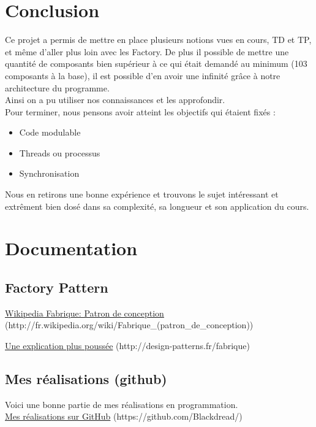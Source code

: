 \documentclass{report}
\begin{document}
\chapter{Conclusion}
Ce projet a permis de mettre en place plusieurs notions vues en cours, TD et TP, et même d'aller plus loin avec les Factory. De plus il possible de mettre une quantité de composants bien supérieur à ce qui était demandé au minimum (103 composants à la base), il est possible d'en avoir une infinité grâce à notre architecture du programme.\\
Ainsi on a pu utiliser nos connaissances et les approfondir.\\


Pour terminer, nous pensons avoir atteint les objectifs qui étaient fixés : 
\begin{itemize}
\item Code modulable
\item Threads ou processus
\item Synchronisation\\
\end{itemize}


Nous en retirons une bonne expérience et trouvons le sujet intéressant et extrêment bien dosé dans sa complexité, sa longueur et son application du cours.

\appendix
\chapter{Documentation}
\section{Factory Pattern}

\href{http://fr.wikipedia.org/wiki/Fabrique_(patron_de_conception)}{Wikipedia Fabrique: Patron de conception} (http://fr.wikipedia.org/wiki/Fabrique\_(patron\_de\_conception))


\href{http://design-patterns.fr/fabrique}{Une explication plus poussée} (http://design-patterns.fr/fabrique)
\section{Mes réalisations (github)}\label{realisation}
Voici une bonne partie de mes réalisations en programmation.
\\
\href{https://github.com/Blackdread/}{Mes réalisations sur GitHub} (https://github.com/Blackdread/)
\\

\end{document}
